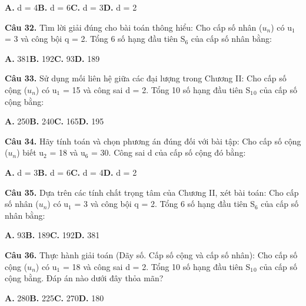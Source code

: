 \documentclass[11pt,a4paper]{article}
\begin{document}
\hspace*{1.5em}\textbf{A.} d = 4\quad\quad \textbf{B.} d = 6\quad\quad \textbf{C.} d = 3\quad\quad \textbf{D.} d = 2\par\vspace{2pt}
\textbf{\color{primary} Câu 32.} Tìm lời giải đúng cho bài toán thông hiểu: Cho cấp số nhân ($u_n$) có u$_1$ = 3 và công bội q = 2. Tổng 6 số hạng đầu tiên S$_6$ của cấp số nhân bằng:\par
\hspace*{1.5em}\textbf{A.} 381\quad\quad \textbf{B.} 192\quad\quad \textbf{C.} 93\quad\quad \textbf{D.} 189\par\vspace{2pt}
\textbf{\color{primary} Câu 33.} Sử dụng mối liên hệ giữa các đại lượng trong Chương II: Cho cấp số cộng ($u_n$) có u$_1$ = 15 và công sai d = 2. Tổng 10 số hạng đầu tiên S$_1$$_0$ của cấp số cộng bằng:\par
\hspace*{1.5em}\textbf{A.} 250\quad\quad \textbf{B.} 240\quad\quad \textbf{C.} 165\quad\quad \textbf{D.} 195\par\vspace{2pt}
\textbf{\color{primary} Câu 34.} Hãy tính toán và chọn phương án đúng đối với bài tập: Cho cấp số cộng ($u_n$) biết u$_2$ = 18 và u$_6$ = 30. Công sai d của cấp số cộng đó bằng:\par
\hspace*{1.5em}\textbf{A.} d = 3\quad\quad \textbf{B.} d = 6\quad\quad \textbf{C.} d = 4\quad\quad \textbf{D.} d = 2\par\vspace{2pt}
\textbf{\color{primary} Câu 35.} Dựa trên các tính chất trọng tâm của Chương II, xét bài toán: Cho cấp số nhân ($u_n$) có u$_1$ = 3 và công bội q = 2. Tổng 6 số hạng đầu tiên S$_6$ của cấp số nhân bằng:\par
\hspace*{1.5em}\textbf{A.} 93\quad\quad \textbf{B.} 189\quad\quad \textbf{C.} 192\quad\quad \textbf{D.} 381\par\vspace{2pt}
\textbf{\color{primary} Câu 36.} Thực hành giải toán (Dãy số. Cấp số cộng và cấp số nhân): Cho cấp số cộng ($u_n$) có u$_1$ = 18 và công sai d = 2. Tổng 10 số hạng đầu tiên S$_1$$_0$ của cấp số cộng bằng. Đáp án nào dưới đây thỏa mãn?\par
\hspace*{1.5em}\textbf{A.} 280\quad\quad \textbf{B.} 225\quad\quad \textbf{C.} 270\quad\quad \textbf{D.} 180\par\vspace{2pt}
\end{document}
